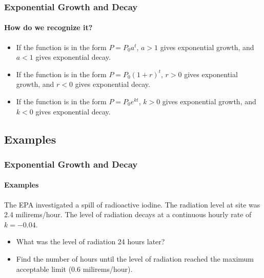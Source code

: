 \documentclass[9pt,xcolor=x11names,compress]{beamer}
\begin{document}
\begin{frame}[c]\frametitle{Exponential Growth and Decay}
    
\framesubtitle{How do we recognize it?}

\begin{itemize}[<+->]
  \item If the function is in the form $P = P_0 a^t$, $a>1$ gives exponential growth, and $a<1$ gives exponential decay.
  \item If the function is in the form $P = P_0 (1+r)^t$, $r>0$ gives exponential growth, and $r<0$ gives exponential decay.
  \item If the function is in the form $P = P_0 e^{kt}$, $k>0$ gives exponential growth, and $k<0$ gives exponential decay.
\end{itemize}
\end{frame}

\subsection{Examples}
\begin{frame}[t]\frametitle{Exponential Growth and Decay}
\framesubtitle{Examples}
\begin{example}
	The EPA investigated a spill of radioactive iodine.  The radiation level at site was 2.4 milirems/hour.  The level of radiation \alert{decays} at a \alert{continuous hourly rate} of $k=-0.04$.
	\begin{itemize}
		\item \alert<2>{What was the level of radiation 24 hours later?}
		\item \alert<3->{Find the number of hours until the level of radiation reached the maximum acceptable limit (0.6 milirems/hour).}
	\end{itemize}
\end{example}
\end{frame}
\end{document}
